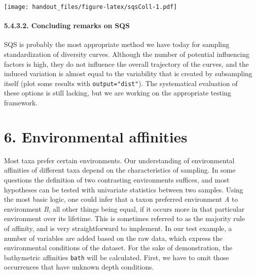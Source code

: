 \documentclass[]{article}
\newenvironment{Shaded}{\begin{snugshade}}{\end{snugshade}}
\newcommand{\NormalTok}[1]{#1}
\newcommand{\OperatorTok}[1]{\textcolor[rgb]{0.81,0.36,0.00}{\textbf{#1}}}
\newcommand{\StringTok}[1]{\textcolor[rgb]{0.31,0.60,0.02}{#1}}
\let\oldparagraph\paragraph
\renewcommand{\paragraph}[1]{\oldparagraph{#1}\mbox{}}
\begin{document}
\texttt{[image: handout\_files/figure-latex/sqsColl-1.pdf]}

\hypertarget{concluding-remarks-on-sqs}{%
\paragraph{5.4.3.2. Concluding remarks on
SQS}\label{concluding-remarks-on-sqs}}

SQS is probably the most appropriate method we have today for sampling
standardization of diversity curves. Although the number of potential
influencing factors is high, they do not influence the overall
trajectory of the curves, and the induced variation is almost equal to
the variability that is created by subsampling itself (plot some results
with \texttt{output="dist"}). The systematical evaluation of these
options is still lacking, but we are working on the appropriate testing
framework.

\hypertarget{environmental-affinities}{%
\section{6. Environmental affinities}\label{environmental-affinities}}

Most taxa prefer certain environments. Our understanding of
environmental affinities of different taxa depend on the characteristics
of sampling. In some questions the definition of two contrasting
environments suffices, and most hypotheses can be tested with univariate
statistics between two samples. Using the most basic logic, one could
infer that a taxon preferred environment \emph{A} to environment
\emph{B}, all other things being equal, if it occurs more in that
particular environment over its lifetime. This is sometimes referred to
as the majority rule of affinity, and is very straightforward to
implement. In our test example, a number of variables are added based on
the raw data, which express the environmental conditions of the dataset.
For the sake of demonstration, the bathymetric affinities \texttt{bath}
will be calculated. First, we have to omit those occurrences that have
unknown depth conditions.

\begin{Shaded}
\end{Shaded}
\end{document}
